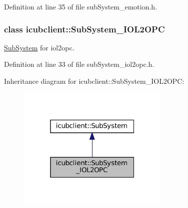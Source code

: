 Definition at line 35 of file sub\+System\+\_\+emotion.\+h.

\label{classicubclient_1_1SubSystem__IOL2OPC}
\subsubsection{class icubclient\+:\+:Sub\+System\+\_\+\+I\+O\+L2\+O\+PC}
\hyperlink{group__icubclient__subsystems_classicubclient_1_1SubSystem}{Sub\+System} for iol2opc. 

Definition at line 33 of file sub\+System\+\_\+iol2opc.\+h.



Inheritance diagram for icubclient\+:\+:Sub\+System\+\_\+\+I\+O\+L2\+O\+PC\+:
\nopagebreak
\begin{figure}[H]
\begin{center}
\leavevmode
\includegraphics[width=205pt]{classicubclient_1_1SubSystem__IOL2OPC__inherit__graph}
\end{center}
\end{figure}
